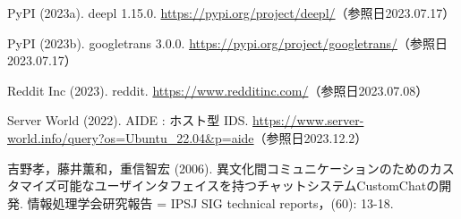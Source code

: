 \documentclass[b5paper,12pt,dvipdfmx]{jsreport}
\begin{document}
\begin{thebibliography}{99}
PyPI (2023a). deepl 1.15.0. \url{https://pypi.org/project/deepl/}（参照日2023.07.17）

PyPI (2023b). googletrans 3.0.0. \url{https://pypi.org/project/googletrans/}（参照日2023.07.17）

Reddit Inc (2023). reddit. \url{https://www.redditinc.com/}（参照日2023.07.08）

Server World (2022). AIDE : ホスト型 IDS. \url{https://www.server-world.info/query?os=Ubuntu_22.04&p=aide}（参照日2023.12.2）

吉野孝，藤井薫和，重信智宏 (2006). 異文化間コミュニケーションのためのカスタマイズ可能なユーザインタフェイスを持つチャットシステムCustomChatの開発. 情報処理学会研究報告 = IPSJ SIG technical reports，(60): 13-18.














\end{thebibliography}
\end{document}
